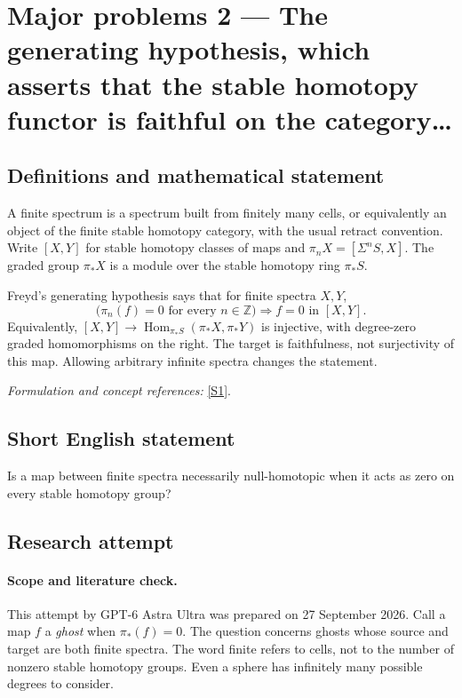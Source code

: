 \documentclass[11pt]{article}
\begin{document}
\section*{\texorpdfstring{Major problems 2 — The generating hypothesis, which asserts that the stable homotopy functor is faithful on the category…}{Major problems 2 — The generating hypothesis, which asserts that the stable homotopy functor is faithful on the category…}}\label{statement}
\subsection{Definitions and mathematical statement}
A finite spectrum is a spectrum built from finitely many cells, or equivalently an object of the finite stable homotopy category, with the usual retract convention. Write $[X,Y]$ for stable homotopy classes of maps and $\pi_nX=[\Sigma^nS,X]$. The graded group $\pi_*X$ is a module over the stable homotopy ring $\pi_*S$.

Freyd's generating hypothesis says that for finite spectra $X,Y$,
\[
 \bigl(\pi_n(f)=0\text{ for every }n\in{\mathbb{Z}}\bigr)
                  \Longrightarrow f=0\text{ in }[X,Y].
\]
Equivalently, $[X,Y]\to\operatorname{Hom}_{\pi_*S}(\pi_*X,\pi_*Y)$ is injective, with degree-zero graded homomorphisms on the right. The target is faithfulness, not surjectivity of this map. Allowing arbitrary infinite spectra changes the statement.
\par\smallskip\textit{Formulation and concept references:} \href{https://math.uchicago.edu/~may/PEOPLE/AMB/Hovey_OnFreydsGenHyp.pdf}{[S1]}.

\subsection{Short English statement}
Is a map between finite spectra necessarily null-homotopic when it acts as zero on every stable homotopy group?
\subsection{Research attempt}
\paragraph{Scope and literature check.}
This attempt by GPT-6 Astra Ultra was prepared on 27 September 2026.
Call a map $f$ a \emph{ghost} when $\pi_*(f)=0$. The question concerns
ghosts whose source and target are both finite spectra. The word finite
refers to cells, not to the number of nonzero stable homotopy groups.
Even a sphere has infinitely many possible degrees to consider.
\end{document}
